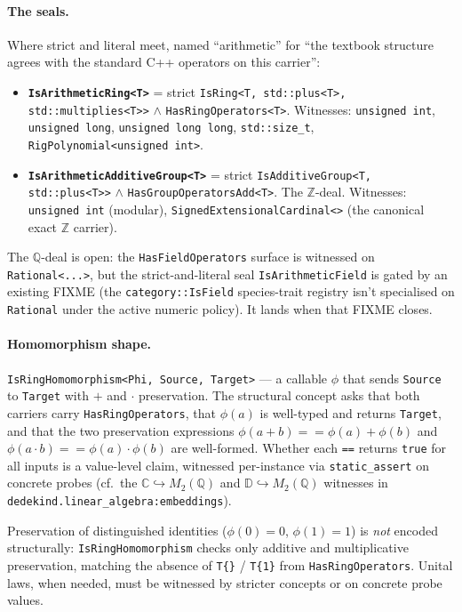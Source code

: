 \documentclass[11pt, a4paper]{report}
\begin{document}
\paragraph{The seals.} Where strict and literal meet, named ``arithmetic'' for ``the textbook structure agrees with the standard C++ operators on this carrier'':

\begin{itemize}
  \item \textbf{\texttt{IsArithmeticRing<T>}} = strict \texttt{IsRing<T, std::plus<T>, std::multiplies<T>>} $\wedge$ \texttt{HasRingOperators<T>}. Witnesses: \texttt{unsigned int}, \texttt{unsigned long}, \texttt{unsigned long long}, \texttt{std::size\_t}, \texttt{RigPolynomial<unsigned int>}.
  \item \textbf{\texttt{IsArithmeticAdditiveGroup<T>}} = strict \texttt{IsAdditiveGroup<T, std::plus<T>>} $\wedge$ \texttt{HasGroupOperatorsAdd<T>}. The $\mathbb{Z}$-deal. Witnesses: \texttt{unsigned int} (modular), \texttt{SignedExtensionalCardinal<>} (the canonical exact $\mathbb{Z}$ carrier).
\end{itemize}

The $\mathbb{Q}$-deal is open: the \texttt{HasFieldOperators} surface is witnessed on \texttt{Rational<...>}, but the strict-and-literal seal \texttt{IsArithmeticField} is gated by an existing FIXME (the \texttt{category::IsField} species-trait registry isn't specialised on \texttt{Rational} under the active numeric policy). It lands when that FIXME closes.

\paragraph{Homomorphism shape.} \texttt{IsRingHomomorphism<Phi, Source, Target>} --- a callable $\phi$ that sends \texttt{Source} to \texttt{Target} with $+$ and $\cdot$ preservation. The structural concept asks that both carriers carry \texttt{HasRingOperators}, that $\phi(a)$ is well-typed and returns \texttt{Target}, and that the two preservation expressions $\phi(a + b) \mathrel{=\!=} \phi(a) + \phi(b)$ and $\phi(a \cdot b) \mathrel{=\!=} \phi(a) \cdot \phi(b)$ are well-formed. Whether each \texttt{==} returns \texttt{true} for all inputs is a value-level claim, witnessed per-instance via \texttt{static\_assert} on concrete probes (cf.\ the $\mathbb{C} \hookrightarrow M_2(\mathbb{Q})$ and $\mathbb{D} \hookrightarrow M_2(\mathbb{Q})$ witnesses in \texttt{dedekind.linear\_algebra:embeddings}).

Preservation of distinguished identities ($\phi(0) = 0$, $\phi(1) = 1$) is \emph{not} encoded structurally: \texttt{IsRingHomomorphism} checks only additive and multiplicative preservation, matching the absence of \texttt{T\{\}} / \texttt{T\{1\}} from \texttt{HasRingOperators}. Unital laws, when needed, must be witnessed by stricter concepts or on concrete probe values.
\end{document}
